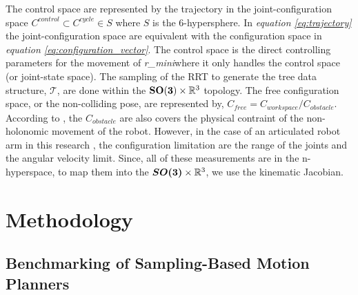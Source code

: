 \documentclass[a4paper, 10pt]{article}
\numberwithin{equation}{section} %
\newcommand\rimini[0]{\textit{r\_mini}} %
\begin{document}
The control space are represented by the trajectory in the joint-configuration
space $C^{control} \subset C^{cycle}\in S $
where $S$ is the 6-hypersphere. In \textit{equation \ref{eq:trajectory}} the
joint-configuration space are equivalent with the configuration space in 
\textit{equation \ref{eq:configuration_vector}}. 
The control space
is the direct controlling parameters for the movement of 
\rimini where it
only handles the control space (or joint-state space).
The sampling of the RRT to generate the tree data structure, $\mathcal{T}$,
are done within the $\vb{SO(3)} \times \mathbb{R}^3$ topology. The free
configuration space, or the non-colliding pose, are represented by, 
$C_{free} = C_{workspace} / C_{obstacle}$. According to 
\textcite{LaValle1998}, the $C_{obstacle}$ are also covers 
the physical contraint of the non-holonomic movement of the robot. 
However, in the case of an articulated robot arm in this research
, the configuration 
limitation are the range of the joints and the angular velocity limit. 
Since, all of these
measurements are in the n-hyperspace, to map them into the
$\vb*{SO(3)} \times \mathbb{R}^3$, we use the kinematic Jacobian.




\section{Methodology}

\subsection{Benchmarking of Sampling-Based Motion Planners}
\end{document}
